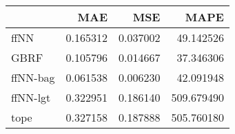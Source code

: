 \begin{tabular}{lrrr}
\toprule
{} &       MAE &       MSE &        MAPE \\
\midrule
ffNN     &  0.165312 &  0.037002 &   49.142526 \\
GBRF     &  0.105796 &  0.014667 &   37.346306 \\
ffNN-bag &  0.061538 &  0.006230 &   42.091948 \\
ffNN-lgt &  0.322951 &  0.186140 &  509.679490 \\
tope     &  0.327158 &  0.187888 &  505.760180 \\
\bottomrule
\end{tabular}
